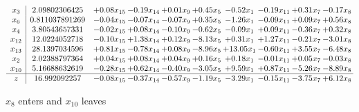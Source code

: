 \documentclass[9pt]{article}
\begin{document}
 \[\begin{array}{c| c c@{\hskip 2pt} c@{\hskip 2pt} c@{\hskip 2pt} c@{\hskip 2pt} c@{\hskip 2pt} c@{\hskip 2pt} c@{\hskip 2pt} c@{\hskip 2pt} }
 x_{3}   &  2.09802306425 & +  0.08 x_{15} & -0.19 x_{14} & +  0.01 x_{9} & +  0.45 x_{5} & -0.52 x_{1} & -0.19 x_{11} & +  0.31 x_{7} & -0.17 x_{8}\\
 x_{6}   &  0.811037891269 & -0.04 x_{15} & -0.07 x_{14} & -0.07 x_{9} & +  0.35 x_{5} & -1.26 x_{1} & -0.09 x_{11} & +  0.09 x_{7} & +  0.56 x_{8}\\
 x_{4}   &  3.80543657331 & -0.02 x_{15} & +  0.08 x_{14} & -0.10 x_{9} & -0.62 x_{5} & -0.09 x_{1} & +  0.09 x_{11} & -0.36 x_{7} & +  0.32 x_{8}\\
 x_{12}   &  12.0224052718 & -0.10 x_{15} & +  1.38 x_{14} & +  0.12 x_{9} & -8.13 x_{5} & +  0.31 x_{1} & +  1.27 x_{11} & -0.21 x_{7} & -3.01 x_{8}\\
 x_{13}   &  28.1397034596 & +  0.81 x_{15} & -0.78 x_{14} & +  0.08 x_{9} & -8.96 x_{5} & + 13.05 x_{1} & -0.60 x_{11} & +  3.55 x_{7} & -6.48 x_{8}\\
 x_{2}   &  2.02388797364 & +  0.04 x_{15} & +  0.08 x_{14} & +  0.04 x_{9} & +  0.16 x_{5} & +  0.18 x_{1} & -0.01 x_{11} & +  0.05 x_{7} & -0.03 x_{8}\\
 x_{10}   &  5.16688632619 & -0.28 x_{15} & +  0.62 x_{14} & -0.40 x_{9} & -3.05 x_{5} & +  9.59 x_{1} & +  0.87 x_{11} & -5.26 x_{7} & -8.89 x_{8}\\
\hline
z    &  16.992092257 & -0.08 x_{15} & -0.37 x_{14} & -0.57 x_{9} & -1.19 x_{5} & -3.29 x_{1} & -0.15 x_{11} & -3.75 x_{7} & +  6.12 x_{8}\\
\end{array}\]


 $ x_{8} $ enters and $ x_{10} $ leaves 
\end{document}
